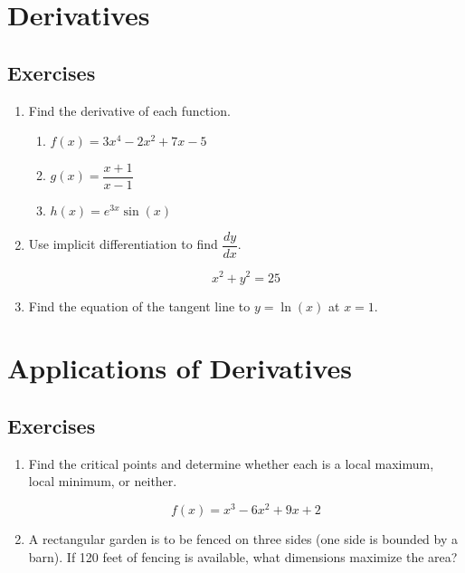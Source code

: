 \documentclass[
    language=english,
    doctype=workbook,
    institution=none,
]{../../omnilatex}
\begin{document}
\section{Derivatives}

\subsection{Exercises}

\begin{enumerate}[label=\textbf{2.\arabic*}]

    \item Find the derivative of each function.

    \begin{enumerate}[label=(\alph*)]
        \item $f(x) = 3x^{4} - 2x^{2} + 7x - 5$
        \vspace{2cm}

        \item $g(x) = \dfrac{x+1}{x-1}$
        \vspace{2cm}

        \item $h(x) = e^{3x}\sin(x)$
        \vspace{2cm}
    \end{enumerate}

    \item Use implicit differentiation to find $\dfrac{dy}{dx}$.

    \[
        x^{2} + y^{2} = 25
    \]
    \vspace{3cm}

    \item Find the equation of the tangent line to $y = \ln(x)$ at $x=1$.
    \vspace{4cm}

\end{enumerate}

\section{Applications of Derivatives}

\subsection{Exercises}

\begin{enumerate}[label=\textbf{3.\arabic*}]

    \item Find the critical points and determine whether each is a local
          maximum, local minimum, or neither.

    \[
        f(x) = x^{3} - 6x^{2} + 9x + 2
    \]
    \vspace{5cm}

    \item A rectangular garden is to be fenced on three sides (one side is
          bounded by a barn). If 120 feet of fencing is available, what
          dimensions maximize the area?
    \vspace{5cm}

\end{enumerate}
\end{document}
